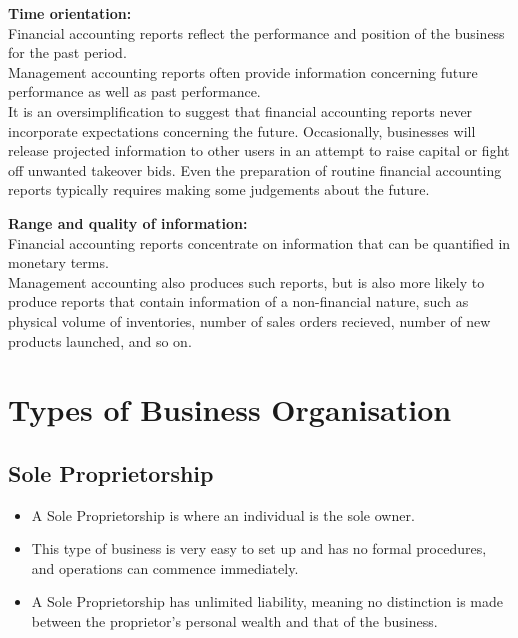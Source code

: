 \documentclass{report}
\newenvironment{blackbox}[1][Black]
  {\begin{tcolorbox}[colframe=#1,colback=white]}
  {\end{tcolorbox}}
\begin{document}
\begin{blackbox}
    \textbf{Time orientation:}\\
    Financial accounting reports reflect the performance and position of the business for the past period.\\
    Management accounting reports often provide information concerning future performance as well as past performance.\\
    It is an oversimplification to suggest that financial accounting reports never incorporate expectations concerning the future. Occasionally, businesses will release projected information to other users in an attempt to raise capital or fight off unwanted takeover bids. Even the preparation of routine financial accounting reports typically requires making some judgements about the future.
\end{blackbox}

\begin{blackbox}
    \textbf{Range and quality of information:}\\
    Financial accounting reports concentrate on information that can be quantified in monetary terms.\\
    Management accounting also produces such reports, but is also more likely to produce reports that contain information of a non-financial nature, such as physical volume of inventories, number of sales orders recieved, number of new products launched, and so on. 
\end{blackbox}

\section{Types of Business Organisation}

\subsection{Sole Proprietorship}
\begin{itemize}
    \item A Sole Proprietorship is where an individual is the sole owner.
    \item This type of business is very easy to set up and has no formal procedures, and operations can commence immediately.
    \item A Sole Proprietorship has unlimited liability, meaning no distinction is made between the proprietor's personal wealth and that of the business.
\end{itemize}
\end{document}
